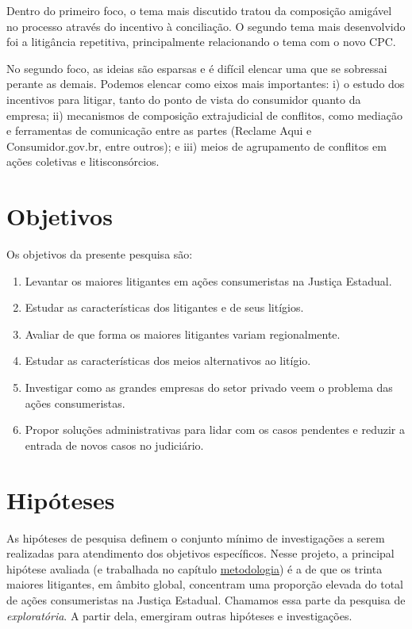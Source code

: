 \documentclass[]{report}
\providecommand{\tightlist}{%
  \setlength{\itemsep}{0pt}\setlength{\parskip}{0pt}}
\begin{document}
Dentro do primeiro foco, o tema mais discutido tratou da composição
amigável no processo através do incentivo à conciliação. O segundo tema
mais desenvolvido foi a litigância repetitiva, principalmente
relacionando o tema com o novo CPC. 

No segundo foco, as ideias são esparsas e é difícil elencar uma que se
sobressai perante as demais. Podemos elencar como eixos mais
importantes: i) o estudo dos incentivos para litigar, tanto do ponto de
vista do consumidor quanto da empresa; ii) mecanismos de composição
extrajudicial de conflitos, como mediação e ferramentas de comunicação
entre as partes (Reclame Aqui e Consumidor.gov.br, entre outros); e iii)
meios de agrupamento de conflitos em ações coletivas e litisconsórcios.

\section{Objetivos}\label{objetivos}

Os objetivos da presente pesquisa são:

\begin{enumerate}
\def\labelenumi{\arabic{enumi}.}
\tightlist
\item
  Levantar os maiores litigantes em ações consumeristas na Justiça
  Estadual.
\item
  Estudar as características dos litigantes e de seus litígios.
\item
  Avaliar de que forma os maiores litigantes variam regionalmente.
\item
  Estudar as características dos meios alternativos ao litígio.
\item
  Investigar como as grandes empresas do setor privado veem o problema
  das ações consumeristas.
\item
  Propor soluções administrativas para lidar com os casos pendentes e
  reduzir a entrada de novos casos no judiciário.
\end{enumerate}

\section{Hipóteses}\label{hipoteses}

As hipóteses de pesquisa definem o conjunto mínimo de investigações a
serem realizadas para atendimento dos objetivos específicos. Nesse
projeto, a principal hipótese avaliada (e trabalhada no capítulo
\protect\hyperlink{metodologia}{metodologia}) é a de que os trinta
maiores litigantes, em âmbito global, concentram uma proporção elevada
do total de ações consumeristas na Justiça Estadual. Chamamos essa parte
da pesquisa de \emph{exploratória}. A partir dela, emergiram outras
hipóteses e investigações.
\end{document}
